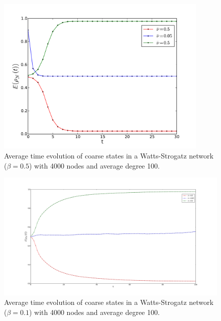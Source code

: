 \documentclass[]{article}
\begin{document}
\begin{figure}
\includegraphics[width=0.9\textwidth]{time_evolution_small_world_M1000_N4000.pdf}
\caption{Average time evolution of coarse states in a Watts-Strogatz network ($\beta=0.5$) with  4000 nodes and average degree 100.}
\label{fig:time_evolution_watts}
\end{figure}

\begin{figure}
\includegraphics[width=1.3\textwidth]{time_evolution_small_world_M1000_N4000_beta0p1.pdf}
\caption{Average time evolution of coarse states in a Watts-Strogatz network ($\beta=0.1$) with  4000 nodes and average degree 100.}
\label{fig:time_evolution_watts}
\end{figure}
\end{document}
